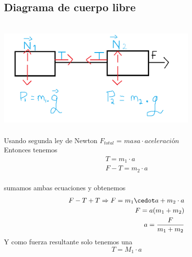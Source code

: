 \documentclass[a4paper, 12pt]{article}
\begin{document}
   \subsection*{ Diagrama de cuerpo libre}
     \includegraphics[width=10cm, height=6cm]{diagrama de cuerpo libre.png}\\
Usando segunda ley de Newton $F_{total}$ = $masa\cdot aceleración$\\
Entonces tenemos\\
\begin{align*}
    T= m_1 \cdot a\\
    F-T = m_2 \cdot a
\end{align*}\\
sumamos ambas ecuaciones y obtenemos \\
\begin{align*}
    F-T+T \Rightarrow{F} = m_1 \cedot a + m_2 \cdot a\\
    F= a (m_1+m_2)\\
    a = \frac{F}{m_1+m_2}
\end{align*}
Y como fuerza resultante solo tenemos una\\
\begin{equation*}
   T = M_1 \cdot a
\end{equation*}
\end{document}
